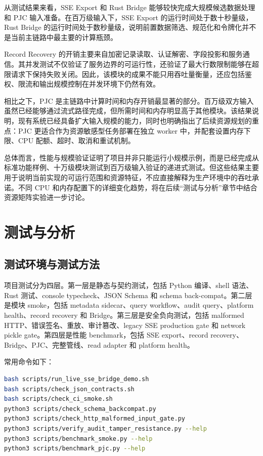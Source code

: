 \documentclass[UTF8,a4paper,12pt,oneside]{ctexrep}
\begin{document}
从测试结果来看，SSE Export 和 Rust Bridge 能够较快完成大规模候选数据处理和 PJC 输入准备。在百万级输入下，SSE Export 的运行时间处于数十秒量级，Rust Bridge 的运行时间处于数秒量级，说明前置数据筛选、规范化和令牌化并不是当前主链路中最主要的计算瓶颈。

Record Recovery 的开销主要来自加密记录读取、认证解密、字段投影和服务通信。其并发测试不仅验证了服务边界的可运行性，还验证了最大行数限制能够在超限请求下保持失败关闭。因此，该模块的成果不能只用吞吐量衡量，还应包括鉴权、限流和输出规模控制在并发环境下仍然有效。

相比之下，PJC 是主链路中计算时间和内存开销最显著的部分。百万级双方输入虽然已经能够通过流式路径完成，但所需时间和内存明显高于其他模块。该结果说明，现有系统已经具备扩大输入规模的能力，同时也明确指出了后续资源规划的重点：PJC 更适合作为资源敏感型任务部署在独立 worker 中，并配套设置内存下限、CPU 配额、超时、取消和重试机制。

总体而言，性能与规模验证证明了项目并非只能运行小规模示例，而是已经完成从标准功能样例、十万级模块测试到百万级输入验证的递进式测试。但这些结果主要用于说明当前实现的可运行范围和资源特征，不应直接解释为生产环境中的吞吐承诺。不同 CPU 和内存配置下的详细变化趋势，将在后续“测试与分析”章节中结合资源矩阵实验进一步讨论。




\chapter{测试与分析}

\section{测试环境与测试方法}

项目测试分为四层。第一层是静态与契约测试，包括 Python 编译、shell 语法、Rust 测试、console typecheck、JSON Schema 和 schema back-compat。第二层是模块 smoke，包括 metadata sidecar、query workflow、audit query、platform health、record recovery 和 Bridge。第三层是安全负向测试，包括 malformed HTTP、错误签名、重放、审计篡改、legacy SSE production gate 和 network pickle gate。第四层是性能 benchmark，包括 SSE export、record recovery、Bridge、PJC、完整管线、read adapter 和 platform health。

常用命令如下：

\begin{lstlisting}[language=bash]
bash scripts/run_live_sse_bridge_demo.sh
bash scripts/check_json_contracts.sh
bash scripts/check_ci_smoke.sh
python3 scripts/check_schema_backcompat.py
python3 scripts/check_http_malformed_input_gate.py
python3 scripts/verify_audit_tamper_resistance.py --help
python3 scripts/benchmark_smoke.py --help
python3 scripts/benchmark_pjc.py --help
\end{lstlisting}
\end{document}
